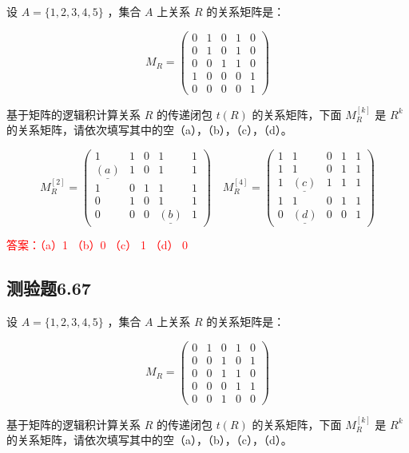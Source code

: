 \documentclass[UTF8, heading=true]{ctexart}
\begin{document}
设 $A=\{1,2,3,4,5\}$ ，集合 $A$ 上关系 $R$ 的关系矩阵是：

$$
M_R=\left(\begin{array}{lllll}
0 & 1 & 0 & 1 & 0 \\
0 & 1 & 0 & 1 & 0 \\
0 & 0 & 1 & 1 & 0 \\
1 & 0 & 0 & 0 & 1 \\
0 & 0 & 0 & 0 & 1
\end{array}\right)
$$


基于矩阵的逻辑积计算关系 $R$ 的传递闭包 $t(R)$ 的关系矩阵，下面 $M_R^{[k]}$ 是 $R^k$ 的关系矩阵，请依次填写其中的空（a），（b），（c），（d）。

$$
M_R^{[2]}=\left(\begin{array}{ccccc}
1 & 1 & 0 & 1 & 1 \\
\underline{(a)} & 1 & 0 & 1 & 1 \\
1 & 0 & 1 & 1 & 1 \\
0 & 1 & 0 & 1 & 1 \\
0 & 0 & 0 & \underline{(b)} & 1
\end{array}\right) \quad M_R^{[4]}=\left(\begin{array}{ccccc}
1 & 1 & 0 & 1 & 1 \\
1 & 1 & 0 & 1 & 1 \\
1 & \underline{(c)} & 1 & 1 & 1 \\
1 & 1 & 0 & 1 & 1 \\
0 & \underline{(d)} & 0 & 0 & 1
\end{array}\right)
$$


\textcolor{red}{答案：（a）1 （b）0 （c） 1 （d） 0}

\subsection{测验题6.67}

设 $A=\{1,2,3,4,5\}$ ，集合 $A$ 上关系 $R$ 的关系矩阵是：

$$
M_R=\left(\begin{array}{lllll}
0 & 1 & 0 & 1 & 0 \\
0 & 0 & 1 & 0 & 1 \\
0 & 0 & 1 & 1 & 0 \\
0 & 0 & 0 & 1 & 1 \\
0 & 0 & 1 & 0 & 0
\end{array}\right)
$$

基于矩阵的逻辑积计算关系 $R$ 的传递闭包 $t(R)$ 的关系矩阵，下面 $M_R^{[k]}$ 是 $R^k$ 的关系矩阵，请依次填写其中的空（a），（b），（c），（d）。
\end{document}
